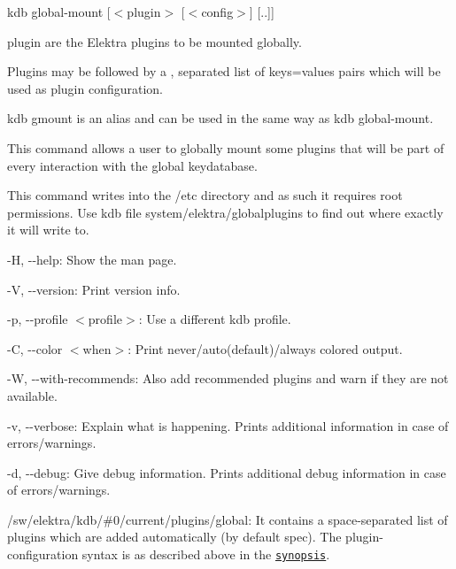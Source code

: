 {\ttfamily kdb global-\/mount \mbox{[}$<$plugin$>$ \mbox{[}$<$config$>$\mbox{]} \mbox{[}..\mbox{]}\mbox{]}}


\begin{DoxyItemize}
\item {\ttfamily plugin} are the Elektra plugins to be mounted globally.
\item Plugins may be followed by a {\ttfamily ,} separated list of {\ttfamily keys=values} pairs which will be used as plugin configuration.
\end{DoxyItemize}

{\ttfamily kdb gmount} is an alias and can be used in the same way as {\ttfamily kdb global-\/mount}.

This command allows a user to globally mount some plugins that will be part of every interaction with the global keydatabase.

This command writes into the {\ttfamily /etc} directory and as such it requires root permissions. Use {\ttfamily kdb file system/elektra/globalplugins} to find out where exactly it will write to.


\begin{DoxyItemize}
\item {\ttfamily -\/H}, {\ttfamily -\/-\/help}\+: Show the man page.
\item {\ttfamily -\/V}, {\ttfamily -\/-\/version}\+: Print version info.
\item {\ttfamily -\/p}, {\ttfamily -\/-\/profile $<$profile$>$}\+: Use a different kdb profile.
\item {\ttfamily -\/C}, {\ttfamily -\/-\/color $<$when$>$}\+: Print never/auto(default)/always colored output.
\item {\ttfamily -\/W}, {\ttfamily -\/-\/with-\/recommends}\+: Also add recommended plugins and warn if they are not available.
\item {\ttfamily -\/v}, {\ttfamily -\/-\/verbose}\+: Explain what is happening. Prints additional information in case of errors/warnings.
\item {\ttfamily -\/d}, {\ttfamily -\/-\/debug}\+: Give debug information. Prints additional debug information in case of errors/warnings.
\end{DoxyItemize}


\begin{DoxyItemize}
\item {\ttfamily /sw/elektra/kdb/\#0/current/plugins/global}\+: It contains a space-\/separated list of plugins which are added automatically (by default {\ttfamily spec}). The plugin-\/configuration syntax is as described above in the \href{#SYNOPSIS}{\tt synopsis}.
\end{DoxyItemize}

